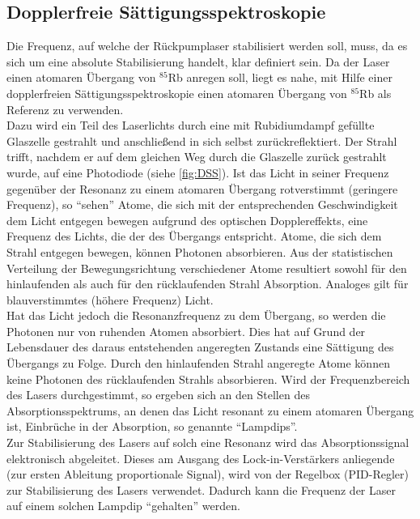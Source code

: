 \documentclass[
class=book,
accentcolor=1b,
custommargins=geometry,
fontsize=11pt,
thesis={type=Versuchsanleitung},
ruledheaders=all,
headline=false,
instbox=false,
marginpar=false,
title=small,
ignore-missing-data=true,
twoside=false,
logofile=apqdesign/tuda_logo.pdf,
pdfa=false %
]{apqpub}
\begin{document}
				\newpage
				
				\subsection{Dopplerfreie Sättigungsspektroskopie}
				
				Die Frequenz, auf welche der Rückpumplaser stabilisiert werden soll, muss, da es sich um eine absolute Stabilisierung handelt, klar definiert sein. Da der Laser einen atomaren Übergang von $^{85}$Rb anregen soll, liegt es nahe, mit Hilfe einer dopplerfreien Sättigungsspektroskopie einen atomaren Übergang von $^{85}$Rb als Referenz zu verwenden.\\
				Dazu wird ein Teil des Laserlichts durch eine mit Rubidiumdampf gefüllte Glaszelle gestrahlt und anschließend in sich selbst zurückreflektiert. Der Strahl trifft, nachdem er auf dem gleichen Weg durch die Glaszelle zurück gestrahlt wurde, auf eine Photodiode (siehe \autoref{fig:DSS}). Ist das Licht in seiner Frequenz gegenüber der Resonanz zu einem atomaren Übergang rotverstimmt (geringere Frequenz), so ``sehen'' Atome, die sich mit der entsprechenden Geschwindigkeit dem Licht entgegen bewegen aufgrund des optischen Dopplereffekts, eine Frequenz des Lichts, die
				der des Übergangs entspricht. Atome, die sich dem Strahl entgegen bewegen, können Photonen absorbieren. Aus der statistischen Verteilung der Bewegungsrichtung verschiedener Atome resultiert sowohl für den hinlaufenden als auch für den rücklaufenden Strahl Absorption. Analoges gilt für blauverstimmtes (höhere Frequenz) Licht.\\
				Hat das Licht jedoch die Resonanzfrequenz zu dem Übergang, so werden die Photonen nur von ruhenden Atomen absorbiert. Dies hat auf Grund der Lebensdauer des daraus entstehenden angeregten Zustands eine Sättigung des Übergangs zu Folge. Durch den hinlaufenden Strahl angeregte Atome können keine Photonen des rücklaufenden Strahls absorbieren. Wird der Frequenzbereich des Lasers durchgestimmt, so ergeben sich an den Stellen des Absorptionsspektrums, an denen das Licht resonant zu einem atomaren Übergang ist, Einbrüche in der Absorption, so genannte ``Lampdips''.\\
				Zur Stabilisierung des Lasers auf solch eine Resonanz wird das Absorptionssignal elektronisch abgeleitet. Dieses am Ausgang des Lock-in-Verstärkers anliegende (zur ersten Ableitung proportionale Signal), wird von der Regelbox (PID-Regler) zur Stabilisierung des Lasers verwendet. Dadurch kann die Frequenz der Laser auf einem solchen Lampdip ``gehalten'' werden.\\
				
\end{document}
